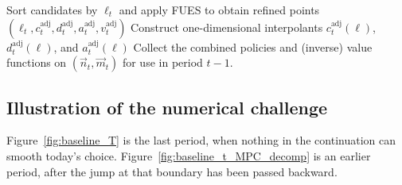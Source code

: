 \begin{algorithm}[htbp]
{{	}
}
Sort candidates by $\ell_t$ and apply FUES to obtain refined points $(\ell_t,c_t^{\mathrm{adj}},d_t^{\mathrm{adj}},a_t^{\mathrm{adj}},v_t^{\mathrm{adj}})$\;
Construct one-dimensional interpolants $c_t^{\mathrm{adj}}(\ell)$, $d_t^{\mathrm{adj}}(\ell)$, and $a_t^{\mathrm{adj}}(\ell)$\;
\BlankLine
{}
Collect the combined policies and (inverse) value functions on $(\vec{n}_t,\vec{m}_t)$ for use in period $t-1$.\;
\end{algorithm}

\subsection{Illustration of the numerical challenge}

Figure~\ref{fig:baseline_T} is the last period, when nothing in the continuation can smooth today's choice. Figure~\ref{fig:baseline_t_MPC_decomp} is an earlier period, after the jump at that boundary has been passed backward.


